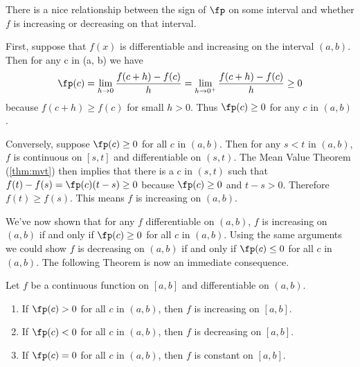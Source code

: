 There is a nice relationship between the sign of $\fp$ on some interval and whether $f$ is increasing or decreasing on that interval.

First, suppose that $f(x)$ is differentiable and increasing on the interval $(a,b)$. Then for any c in (a, b) we have
\[\fp(c)=\lim_{h\to0}\frac{f(c+h)-f(c)}h=\lim_{h\to0^+}\frac{f(c+h)-f(c)}h\ge0\]
because $f(c+h)\ge f(c)$ for small $h>0$. Thus $\fp(c)\ge0$ for any $c$ in $(a,b)$.

Conversely, suppose $\fp(c)\ge0$ for all $c$ in $(a,b)$. Then for any $s<t$ in $(a,b)$, $f$ is continuous on $[s,t]$ and differentiable on $(s,t)$. The Mean Value Theorem (\autoref{thm:mvt}) then implies that there is a $c$ in $(s,t)$ such that
$f(t)-f(s)=\fp(c)(t-s)\ge0$
because $\fp(c)\ge0$ and $t-s>0$. Therefore $f(t)\ge f(s)$. This means $f$ is increasing on $(a,b)$.

We've now shown that for any $f$ differentiable on $(a,b)$,
$f$ is increasing on $(a,b)$ if and only if $\fp(c)\ge0$ for all $c$ in $(a,b)$.
Using the same arguments we could show $f$ is decreasing on $(a,b)$ if and only if $\fp(c)\le0$ for all $c$ in $(a,b)$. The following Theorem is now an immediate consequence.


%
{Let $f$ be a continuous function on $[a,b]$ and differentiable on $(a,b)$.
\begin{enumerate}
\item	If $\fp(c) > 0$ for all $c$ in $(a,b)$, then $f$ is increasing on $[a,b]$.
\item	If $\fp(c) <0$ for all $c$ in $(a,b)$, then $f$ is decreasing on $[a,b]$.
\item	If $\fp(c) =0$ for all $c$ in $(a,b)$, then $f$ is constant on $[a,b]$.
\end{enumerate}}


